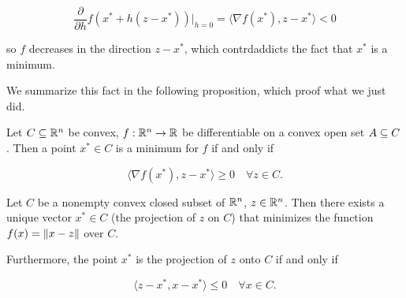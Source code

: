 \[ \frac{\partial}{\partial h} f(x^* + h(z - x^*))|_{h=0} = \langle \nabla f(x^*), z-x^*\rangle < 0 \]

so $f$ decreases in the direction $z - x^*$, which contrdaddicts the fact that $x^*$ is a minimum.

We summarize this fact in the following proposition, which proof what we just did.

\begin{proposition}[Book 1.1.8]
    
    Let $C \subseteq {\mathbb{R}^n}$ be convex, $f: {\mathbb{R}^n} \to \mathbb{R}$ be differentiable on a convex open set $A \subseteq C$. Then a point $x^* \in C$ is a minimum for $f$ if and only if 

    \[ \langle \nabla f(x^*), z-x^*\rangle \ge 0 \quad \forall z \in C. \]

\end{proposition}

\begin{theorem}

    Let $C$ be a nonempty convex closed subset of ${\mathbb{R}^n}$, $z \in {\mathbb{R}^n}$. Then there exists a unique vector $x^* \in C$ (the projection of $z$ on $C$) that minimizes the function $f(x) = \lVert x- z \rVert$ over $C$. 

    Furthermore, the point $x^*$ is the projection of $z$ onto $C$ if and only if 

    \[ \langle z - x^*, x - x^* \rangle \le 0 \quad \forall x \in C. \]
    
\end{theorem}


